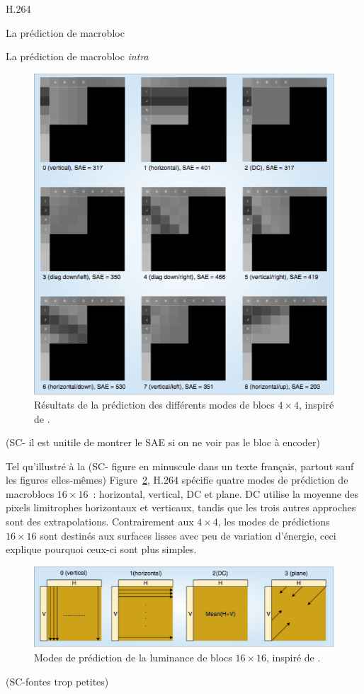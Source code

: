 \documentclass{article}
\begin{document}
\begin{section}{H.264}
\begin{subsection}{La prédiction de macrobloc}
\begin{subsubsection}{La prédiction de macrobloc \textit{intra}}
\begin{figure}%
\centering
\includegraphics[width=\linewidth]{images/4x4PredictionBlocks.png}
\caption{Résultats de la prédiction des différents modes de blocs $4 \times 4$,
inspiré de \cite{richardson2003}.}
\label{fig-4x4PredictionBlocks}
\end{figure}
(SC- il est unitile de montrer le SAE si on ne voir pas le bloc à encoder)

Tel qu'illustré à la (SC- figure en minuscule dans un texte français, partout sauf les figures elles-mêmes) Figure~\ref{fig-16x16PredictionModes}, H.264 spécifie quatre
modes de prédiction de macroblocs $16 \times 16$~: horizontal, vertical, DC et
plane. DC utilise la moyenne des pixels limitrophes horizontaux et verticaux,
tandis que les trois autres approches sont des extrapolations. Contrairement aux
$4 \times 4$, les modes de prédictions $16 \times 16$ sont destinés aux surfaces
lisses avec peu de variation d'énergie, ceci explique pourquoi ceux-ci sont plus
simples.

\begin{figure}%
\centering
\includegraphics[width=\linewidth]{images/16x16PredictionModes.png}
\caption{Modes de prédiction de la luminance de blocs $16 \times 16$, inspiré
de \cite{richardson2003}.}
\label{fig-16x16PredictionModes}
\end{figure}
(SC-fontes trop petites)


\end{subsubsection}
\end{subsection}
\end{section}
\end{document}
